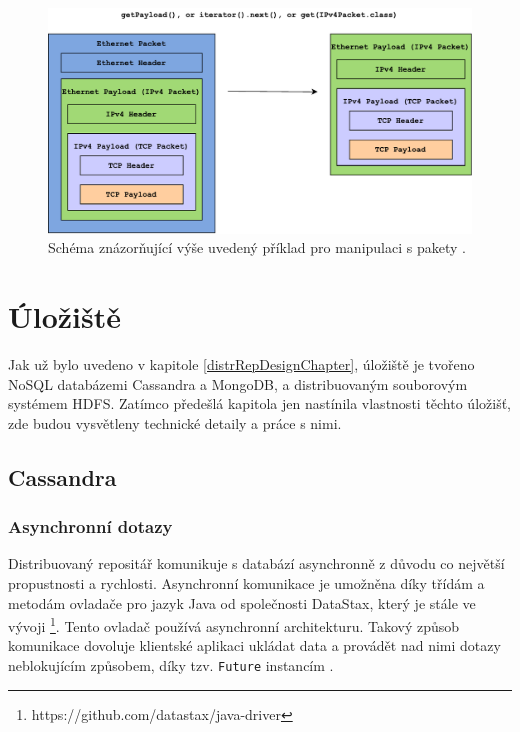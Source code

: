 \begin{figure}[!h]
  \centering
  \includegraphics[width=14.8cm]{template-fig/Pcap4JExample.pdf}
  \caption{Schéma znázorňující výše uvedený příklad pro manipulaci s pakety \cite{gitPcap4J}.}
  \label{FIG_Architecture}
\end{figure}

\section{Úložiště}
Jak už bylo uvedeno v kapitole \ref{distrRepDesignChapter}, úložiště je tvořeno NoSQL databázemi Cassandra a MongoDB, a distribuovaným souborovým systémem HDFS. Zatímco předešlá kapitola jen nastínila vlastnosti těchto úložišť, zde budou vysvětleny technické detaily a práce s nimi.

\subsection{Cassandra}

\subsubsection{Asynchronní dotazy}
Distribuovaný repositář komunikuje s databází asynchronně z důvodu co největší propustnosti a rychlosti. Asynchronní komunikace je umožněna díky třídám a metodám ovladače pro jazyk Java od společnosti DataStax, který je stále ve vývoji \footnote{https://github.com/datastax/java-driver}. Tento ovladač používá asynchronní architekturu. Takový způsob komunikace dovoluje klientské aplikaci ukládat data a provádět nad nimi dotazy neblokujícím způsobem, díky tzv. \texttt{Future} instancím \cite{asyncQueriesCassandra}.

